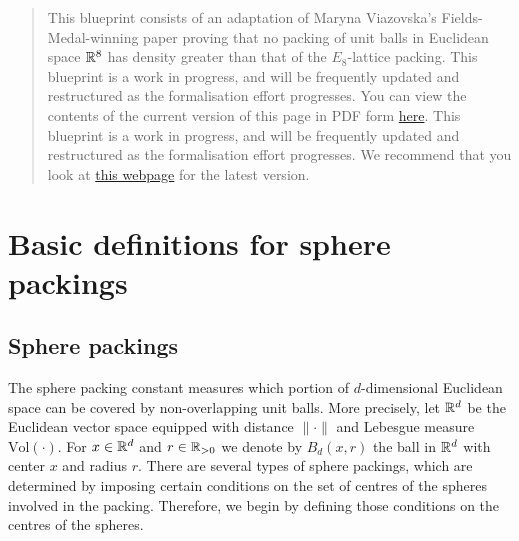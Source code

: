 %

\begin{abstract}
  This blueprint consists of an adaptation of Maryna Viazovska's Fields-Medal-winning paper proving that no packing of unit balls in Euclidean space $\mathbb{R}^8$ has density greater than that of the $E_8$-lattice packing.
  \ifplastex
  This blueprint is a work in progress, and will be frequently updated and restructured as the formalisation effort progresses. You can view the contents of the current version of this page in PDF form \href{https://thefundamentaltheor3m.github.io/Sphere-Packing-Lean/blueprint.pdf}{here}.
  \else
  This blueprint is a work in progress, and will be frequently updated and restructured as the formalisation effort progresses. We recommend that you look at \href{https://thefundamentaltheor3m.github.io/Sphere-Packing-Lean/blueprint/index.html}{this webpage} for the latest version.
  \fi
  \end{abstract}


\section{Basic definitions for sphere packings}

\subsection{Sphere packings}

The sphere packing constant measures which portion of $d$-dimensional Euclidean
space can be covered by non-overlapping unit balls. More precisely, let $\mathbb{R}^d$ be the Euclidean vector space equipped with distance $\|\cdot\|$ and Lebesgue measure $\mathrm{Vol}(\cdot)$. For $x\in\mathbb{R}^d$ and $r\in\mathbb{R}_{>0}$ we denote by $B_d(x,r)$ the ball in $\mathbb{R}^d$ with center $x$ and radius $r$. There are several types of sphere packings, which are determined by imposing certain conditions on the set of centres of the spheres involved in the packing. Therefore, we begin by defining those conditions on the centres of the spheres.

